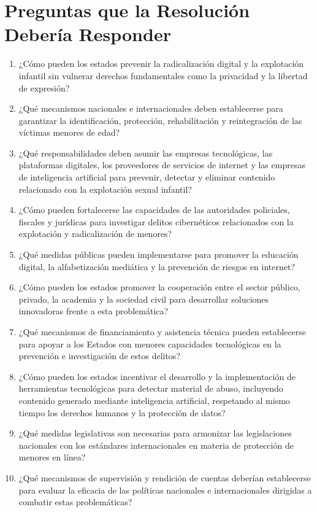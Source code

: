 \section{Preguntas que la Resolución Debería Responder}

\begin{enumerate}
  \item ¿Cómo pueden los estados prevenir la radicalización digital y la explotación infantil sin vulnerar derechos fundamentales como la privacidad y la libertad de expresión?
  \item ¿Qué mecanismos nacionales e internacionales deben establecerse para garantizar la identificación, protección, rehabilitación y reintegración de las víctimas menores de edad?
  \item ¿Qué responsabilidades deben asumir las empresas tecnológicas, las plataformas digitales, los proveedores de servicios de internet y las empresas de inteligencia artificial para prevenir, detectar y eliminar contenido relacionado con la explotación sexual infantil?
  \item ¿Cómo pueden fortalecerse las capacidades de las autoridades policiales, fiscales y jurídicas para investigar delitos cibernéticos relacionados con la explotación y radicalización de menores?
  \item ¿Qué medidas públicas pueden implementarse para promover la educación digital, la alfabetización mediática y la prevención de riesgos en internet?
  \item ¿Cómo pueden los estados promover la cooperación entre el sector público, privado, la academia y la sociedad civil para desarrollar soluciones innovadoras frente a esta problemática?
  \item ¿Qué mecanismos de financiamiento y asistencia técnica pueden establecerse para apoyar a los Estados con menores capacidades tecnológicas en la prevención e investigación de estos delitos?
  \item ¿Cómo pueden los estados incentivar el desarrollo y la implementación de herramientas tecnológicas para detectar material de abuso, incluyendo contenido generado mediante inteligencia artificial, respetando al mismo tiempo los derechos humanos y la protección de datos?
  \item ¿Qué medidas legislativas son necesarias para armonizar las legislaciones nacionales con los estándares internacionales en materia de protección de menores en línea?
  \item ¿Qué mecanismos de supervisión y rendición de cuentas deberían establecerse para evaluar la eficacia de las políticas nacionales e internacionales dirigidas a combatir estas problemáticas?
\end{enumerate}
